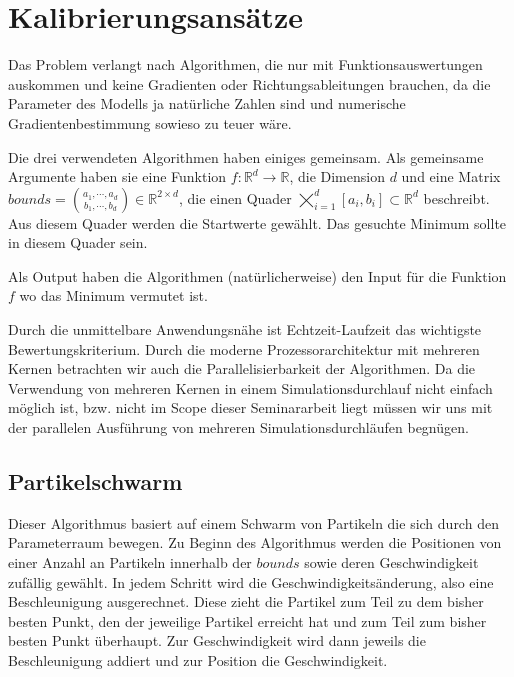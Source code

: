 \documentclass[a4paper,12pt]{article}
\begin{document}
\newpage

\section{Kalibrierungsansätze}

Das Problem verlangt nach Algorithmen, die nur mit Funktionsauswertungen auskommen und keine Gradienten oder Richtungsableitungen brauchen, da die Parameter des Modells ja natürliche Zahlen sind und numerische Gradientenbestimmung sowieso zu teuer wäre.

Die drei verwendeten Algorithmen haben einiges gemeinsam. Als gemeinsame Argumente haben sie eine Funktion $f: \mathbb{R}^d \rightarrow \mathbb{R}$, die Dimension $d$ und eine Matrix $bounds = \binom{a_1, \cdots, a_d}{b_1, \cdots, b_d} \in \mathbb{R}^{2\times d}$, die einen Quader $\bigtimes\nolimits_{i=1}^d [a_i, b_i] \subset \mathbb{R}^d$ beschreibt. Aus diesem Quader werden die Startwerte gewählt. Das gesuchte Minimum sollte in diesem Quader sein. 

Als Output haben die Algorithmen (natürlicherweise) den Input für die Funktion $f$ wo das Minimum vermutet ist. 

Durch die unmittelbare Anwendungsnähe ist Echtzeit-Laufzeit das wichtigste Bewertungskriterium. Durch die moderne Prozessorarchitektur mit mehreren Kernen betrachten wir auch die Parallelisierbarkeit der Algorithmen. Da die Verwendung von mehreren Kernen in einem Simulationsdurchlauf nicht einfach möglich ist, bzw. nicht im Scope dieser Seminararbeit liegt müssen wir uns mit der parallelen Ausführung von mehreren Simulationsdurchläufen begnügen.

\subsection{Partikelschwarm}

Dieser Algorithmus basiert auf einem Schwarm von Partikeln die sich durch den Parameterraum bewegen. Zu Beginn des Algorithmus werden die Positionen von einer Anzahl an Partikeln innerhalb der $bounds$ sowie deren Geschwindigkeit zufällig gewählt. In jedem Schritt wird die Geschwindigkeitsänderung, also eine Beschleunigung ausgerechnet. Diese zieht die Partikel zum Teil zu dem bisher besten Punkt, den der jeweilige Partikel erreicht hat und zum Teil zum bisher besten Punkt überhaupt. Zur Geschwindigkeit wird dann jeweils die Beschleunigung addiert und zur Position die Geschwindigkeit. 
\end{document}
